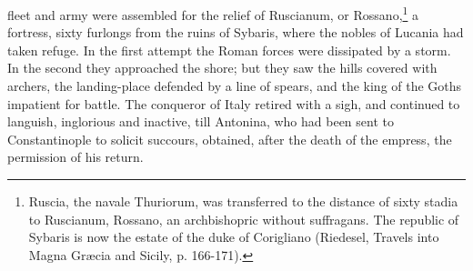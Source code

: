 fleet and army were assembled for the relief of Ruscianum, or Rossano,\footnote{Ruscia, the navale Thuriorum, was transferred to the distance of sixty stadia to Ruscianum, Rossano, an archbishopric without suffragans. The republic of Sybaris is now the estate of the duke of Corigliano (Riedesel, Travels into Magna Græcia and Sicily, p. 166-171).} a fortress, sixty furlongs from the ruins of Sybaris, where the nobles of Lucania had taken refuge. In the first attempt the Roman forces were dissipated by a storm. In the second they approached the shore; but they saw the hills covered with archers, the landing-place defended by a line of spears, and the king of the Goths impatient for battle. The conqueror of Italy retired with a sigh, and continued to languish, inglorious and inactive, till Antonina, who had been sent to Constantinople to solicit succours, obtained, after the death of the empress, the permission of his return.

